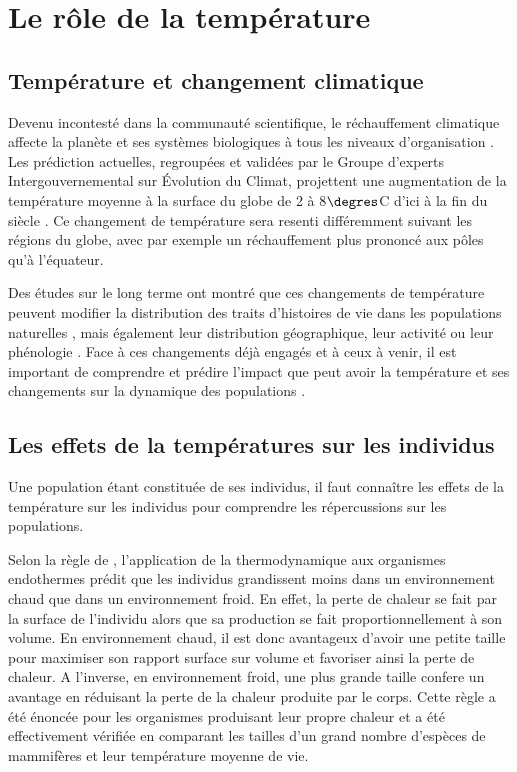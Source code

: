 \section{Le rôle de la température}

\subsection{Température et changement climatique}

Devenu incontesté dans la communauté scientifique, le réchauffement climatique
affecte la planète et ses systèmes biologiques à tous les niveaux
d'organisation \autocites{sagarin1999a,sala2000a,ipcc2007a,walther2002a}. Les
prédiction actuelles, regroupées et validées par le Groupe d’experts
Intergouvernemental sur \'{E}volution du Climat, projettent une augmentation de
la température moyenne à la surface du globe de 2 à 8$\degres$C d'ici à la fin
du siècle \autocites{ipcc2007a}. Ce changement de température sera resenti
différemment suivant les régions du globe, avec par exemple un réchauffement
plus prononcé aux pôles qu'à l'équateur. 

Des études sur le long terme ont montré que ces changements de température
peuvent modifier la distribution des traits d'histoires de vie dans les
populations naturelles \autocites{parmesan2006a,ozgul2009a}, mais également leur
distribution géographique, leur activité ou leur phénologie
\autocites{parmesan2006a,walther2002a}.
Face à ces changements déjà engagés et à ceux à venir, il est important de
comprendre et prédire l'impact que peut avoir la température et ses changements
sur la dynamique des populations \autocite{lavergne2010a}. 

\subsection{Les effets de la températures sur les individus}



Une population étant constituée de ses individus, il faut connaître les effets
de la température sur les individus pour comprendre les répercussions sur les
populations. 

Selon la règle de \textcites{bergmann1848a}, l'application de la thermodynamique
aux organismes endothermes prédit que les individus grandissent moins dans un
environnement chaud que dans un environnement froid. En effet, la perte de
chaleur se fait par la surface de l'individu alors que sa production se fait
proportionnellement à son volume. En environnement chaud, il est donc avantageux
d'avoir une petite taille pour maximiser son rapport surface sur volume et
favoriser ainsi la perte de chaleur. A l'inverse, en environnement froid, une
plus grande taille confere un avantage en réduisant la perte de la chaleur
produite par le corps. Cette règle a été énoncée pour les organismes produisant
leur propre chaleur et a été effectivement vérifiée en comparant les tailles
d'un grand nombre d'espèces de mammifères et leur température moyenne de vie. 

